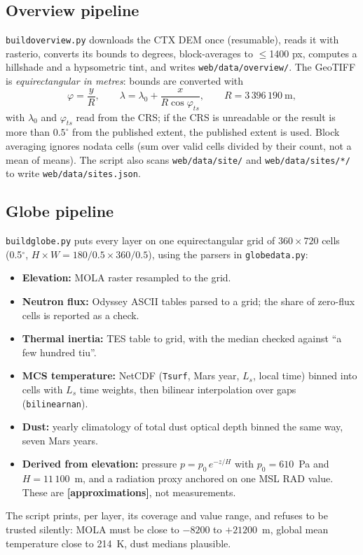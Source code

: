 \documentclass[11pt,a4paper]{article}
\newcommand{\hyp}[1]{\textcolor{marsred}{\textbf{[#1]}}}   %
\renewcommand{\_}{\textunderscore\allowbreak}
\newcommand{\code}[1]{\texttt{#1}}
\begin{document}
\subsection{Overview pipeline}
\code{build\_overview.py} downloads the CTX DEM once (resumable), reads it with rasterio, converts its bounds to degrees, block-averages to $\le$1400 px, computes a hillshade and a hypsometric tint, and writes \code{web/data/overview/}. The GeoTIFF is \emph{equirectangular in metres}: bounds are converted with
\[
\varphi=\frac{y}{R},\qquad \lambda=\lambda_0+\frac{x}{R\cos\varphi_{ts}},\qquad R=3\,396\,190\ \text{m},
\]
with $\lambda_0$ and $\varphi_{ts}$ read from the CRS; if the CRS is unreadable or the result is more than $0.5^\circ$ from the published extent, the published extent is used. Block averaging ignores nodata cells (sum over valid cells divided by their count, not a mean of means). The script also scans \code{web/data/site/} and \code{web/data/sites/*/} to write \code{web/data/sites.json}.

\subsection{Globe pipeline}
\code{build\_globe.py} puts every layer on one equirectangular grid of $360\times720$ cells (0.5$^\circ$, $H\times W=180/0.5\times360/0.5$), using the parsers in \code{globe\_data.py}:
\begin{itemize}
\item \textbf{Elevation:} MOLA raster resampled to the grid.
\item \textbf{Neutron flux:} Odyssey ASCII tables parsed to a grid; the share of zero-flux cells is reported as a check.
\item \textbf{Thermal inertia:} TES table to grid, with the median checked against ``a few hundred tiu''.
\item \textbf{MCS temperature:} NetCDF (\code{Tsurf}, Mars year, $L_s$, local time) binned into cells with $L_s$ time weights, then bilinear interpolation over gaps (\code{\_bilinear\_nan}).
\item \textbf{Dust:} yearly climatology of total dust optical depth binned the same way, seven Mars years.
\item \textbf{Derived from elevation:} pressure $p=p_0\,e^{-z/H}$ with $p_0=610$~Pa and $H=11\,100$~m, and a radiation proxy anchored on one MSL RAD value. These are \hyp{approximations}, not measurements.
\end{itemize}
The script prints, per layer, its coverage and value range, and refuses to be trusted silently: MOLA must be close to $-8200$ to $+21200$~m, global mean temperature close to 214~K, dust medians plausible.
\end{document}
